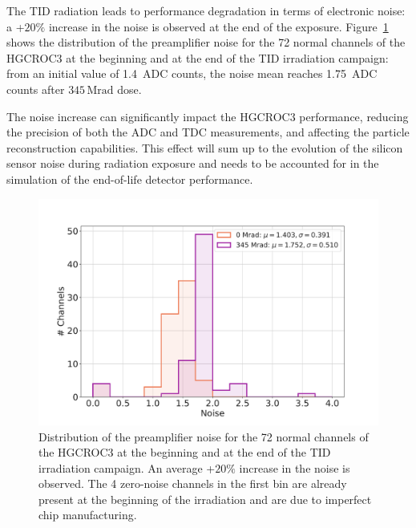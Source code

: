 \bigbreak

The TID radiation leads to performance degradation in terms of electronic noise: a +$20\%$ increase in the noise is observed at the end of the exposure. Figure~\ref{fig:TID_Noise} shows the distribution of the preamplifier noise for the 72 normal channels of the HGCROC3 at the beginning and at the end of the TID irradiation campaign: from an initial value of 1.4~ADC counts, the noise mean reaches 1.75~ADC counts after $345\,\textrm{Mrad}$ dose. 

The noise increase can significantly impact the HGCROC3 performance, reducing the precision of both the ADC and TDC measurements, and affecting the particle reconstruction capabilities. This effect will sum up to the evolution of the silicon sensor noise during radiation exposure and needs to be accounted for in the simulation of the end-of-life detector performance.


\begin{figure}
    \centering
    \includegraphics[width=0.65\linewidth]{Figures/HGCAL/TID_Noise.pdf}
    \caption{Distribution of the preamplifier noise for the 72 normal channels of the HGCROC3 at the beginning and at the end of the TID irradiation campaign. An average +$20\%$ increase in the noise is observed. The 4 zero-noise channels in the first bin are already present at the beginning of the irradiation and are due to imperfect chip manufacturing.}
    \label{fig:TID_Noise}
\end{figure}

